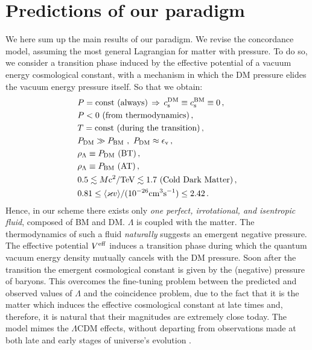 \documentclass[twocolumn,showpacs, nofootinbib,aps,superscriptaddress, eqsecnum,prd,prl,notitlepage,showkeys,10pt,reprint]{revtex4-1}
\begin{document}
\section{Predictions of our paradigm}
\label{predictions}

We here sum up the main results of our paradigm. We revise the concordance model, assuming the most general Lagrangian for matter with pressure. To do so, we consider a transition phase induced by the effective potential of a vacuum energy cosmological constant, with a mechanism in which the DM pressure elides the vacuum energy pressure itself. So that we obtain:
\begin{align}
&P={\rm const}\ {\rm (always)}\,\Rightarrow\,c_{\rm s}^{\rm DM}\equiv c_{\rm s}^{\rm BM}\equiv0\,,\\
&P<0\ {\rm (from\ thermodynamics)}\,,\\
&T={\rm const}\ {\rm (during\ the\ transition)}\,,\\
&P_{\rm DM}\gg P_{\rm BM}\ ,\ P_{\rm DM}\approx\epsilon_{\rm v}\,,\\
&\rho_\Lambda\equiv P_{\rm DM}\ {\rm (BT)}\,,\\
&\rho_\Lambda\equiv P_{\rm BM}\ {\rm (AT)}\,,\\
&0.5\lesssim M{\rm c^2/ TeV} \lesssim1.7 \ {\rm (Cold\ Dark\ Matter)}\,,\\
&0.81\leq\langle \varkappa v\rangle/(10^{-26}{\rm cm}^3{\rm s}^{-1})\leq2.42\,.
\end{align}
%
Hence, in our scheme there exists only \emph{one perfect, irrotational, and isentropic fluid}, composed of BM and DM. $\Lambda$ is coupled with the matter.
The thermodynamics of such a fluid \emph{naturally} suggests an emergent negative pressure.
The effective potential $V^{\rm eff}$ induces a transition phase during which the quantum vacuum energy density mutually cancels with the DM pressure.
Soon after the transition the emergent cosmological constant is given by the (negative) pressure of baryons.
This overcomes the fine-tuning problem between the predicted and observed values of $\Lambda$ and the coincidence problem, due to the fact that it is the matter which induces the effective cosmological constant at late times and, therefore, it is natural that their magnitudes are extremely close today.
The model mimes the $\Lambda$CDM effects, without departing from observations made at both late and early stages of universe's evolution \cite{2012PhRvD..86l3516A,2016A&A...594A..13P}.
\end{document}
